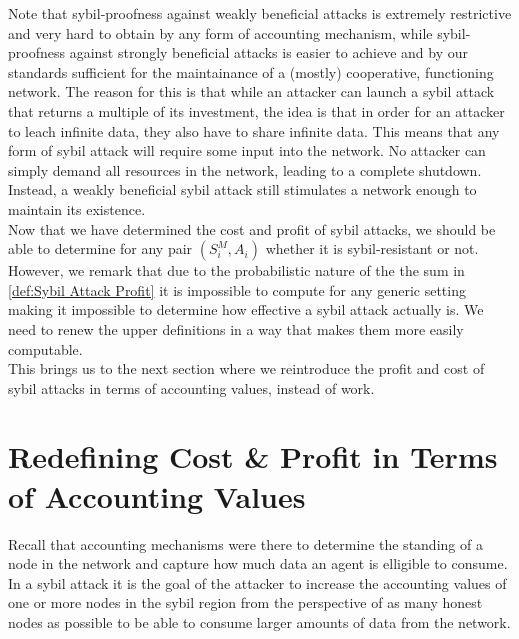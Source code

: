 \noindent{}Note that sybil-proofness against weakly beneficial attacks is extremely restrictive and very hard to obtain by any form of accounting mechanism, while sybil-proofness against strongly beneficial attacks is easier to achieve and by our standards sufficient for the maintainance of a (mostly) cooperative, functioning network. The reason for this is that while an attacker can launch a sybil attack that returns a multiple of its investment, the idea is that in order for an attacker to leach infinite data, they also have to share infinite data. This means that any form of sybil attack will require some input into the network. No attacker can simply demand all resources in the network, leading to a complete shutdown. Instead, a weakly beneficial sybil attack still stimulates a network enough to maintain its existence. \vspace{1em}\\

\noindent{}Now that we have determined the cost and profit of sybil attacks, we should be able to determine for any pair $(S^M_i,A_i)$ whether it is sybil-resistant or not. However, we remark that due to the probabilistic nature of the the sum in \ref{def:Sybil Attack Profit} it is  impossible to compute for any generic setting making it impossible to determine how effective a sybil attack actually is. We need to renew the upper definitions in a way that makes them more easily computable. \vspace{1em}\\

\noindent{}This brings us to the next section where we reintroduce the profit and cost of sybil attacks in terms of accounting values, instead of work. \vspace{1em}\\


\section{Redefining Cost \& Profit in Terms of Accounting Values}
\label{sec:Cost & Profit in Terms of Accounting Values}
\noindent{}Recall that accounting mechanisms were there to determine the standing of a node in the network and capture how much data an agent is elligible to consume. In a sybil attack it is the goal of the attacker to increase the accounting values of one or more nodes in the sybil region from the perspective of as many honest nodes as possible to be able to consume larger amounts of data from the network. \vspace{1em}\\

